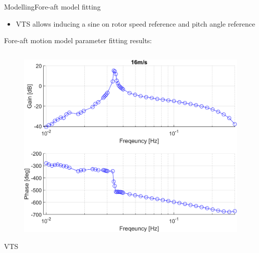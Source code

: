 
\begin{frame}{Modelling}{Fore-aft model fitting}
	\begin{itemize}
		\item VTS allows inducing a sine on rotor speed reference and pitch angle reference
	\end{itemize}
	Fore-aft motion model parameter fitting results:
	\begin{columns}
		\begin{column}{.49\textwidth}
			\begin{figure}[ht]
				\centering
				\includegraphics[width=1\linewidth]{../Graphics/TestResults/foreaftFitting/sysid_thSine-vy_16ms.png}
				\label{fig:sysid_wref-vy_16}
			\end{figure}
		\centering VTS
		\end{column}
	

\end{columns}
\end{frame}
